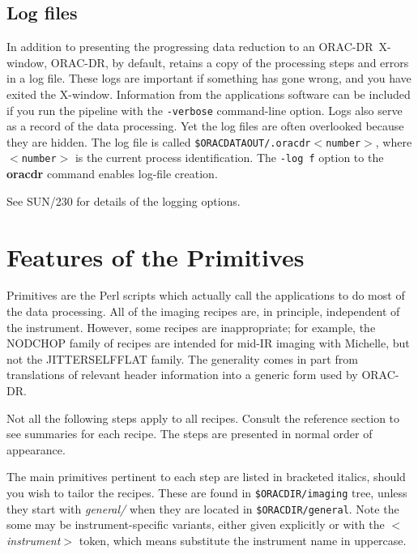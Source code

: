 \documentclass[twoside,11pt]{article}
\newcommand{\htmlref}[2]{#1}
\newcommand{\xref}[3]{#1}
\newcommand{\xlabel}[1]{}
\renewcommand{\_}{\texttt{\symbol{95}}}
\newcommand{\ORACDR}{{\footnotesize ORAC-DR}}
\begin{document}
\subsection{\xlabel{log_files}Log files\label{log_files}}

In addition to presenting the progressing data reduction to an
\ORACDR\ X-window, \ORACDR, by default, retains a copy of the
processing steps and errors in a log file.  These logs are important
if something has gone wrong, and you have exited the X-window.
Information from the applications software can be included if you run
the pipeline with the {\tt -verbose} command-line option.  Logs also
serve as a record of the data processing.  Yet the log files are often
overlooked because they are hidden.  The log file is called
{\tt\$ORAC\_DATA\_OUT/.oracdr\_$<$number$>$}, where {\tt$<$number$>$}
is the current process identification.  The {\tt -log f} option to the
{\bf oracdr} command enables log-file creation.

See \xref{SUN/230}{sun230}{windows_and_output} for details of the
logging options.

\section{\xlabel{features_of_the_primitives}Features of the
Primitives\label{features_of_the_primitives}}

Primitives are the Perl scripts which actually call the applications
to do most of the data processing.  All of the imaging recipes are, in
principle, independent of the instrument.  However, some recipes are
inappropriate; for example, the NOD\_CHOP family of recipes are
intended for mid-IR imaging with Michelle, but not the
\htmlref{JITTER\_SELF\_FLAT}{JITTER\_SELF\_FLAT} family.  The generality
comes in part from translations of relevant header information into a
generic form used by \ORACDR.

Not all the following steps apply to all recipes.  Consult the
\htmlref{reference section}{recipes} to see summaries for each recipe.
The steps are presented in normal order of appearance.

The main primitives pertinent to each step are listed in bracketed
italics, should you wish to tailor the recipes.  These are found in
{\tt\$ORAC\_DIR/imaging} tree, unless they start with {\em general/}
when they are located in {\tt\$ORAC\_DIR/general}.  Note the some may
be instrument-specific variants, either given explicitly or with the
{\em$<$instrument$>$} token, which means substitute the instrument
name in uppercase. 
\end{document}
